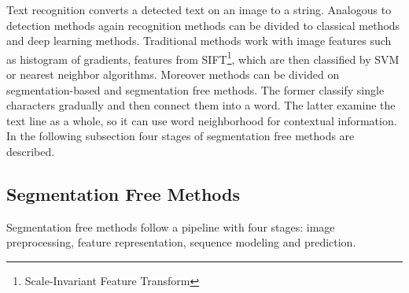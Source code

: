 Text recognition converts a detected text on an image to a string. Analogous to detection methods again recognition methods can be divided to classical methods and deep learning methods. Traditional methods work with image features such as histogram of gradients, features from SIFT\footnote{Scale-Invariant Feature Transform}, which are then classified by SVM or nearest neighbor algorithms. Moreover methods can be divided on segmentation-based and segmentation free methods. The former classify single characters gradually and then connect them into a word. The latter examine the text line as a whole, so it can use word neighborhood for contextual information. In the following subsection four stages of segmentation free methods are described.\cite{chen2021text,raisi2020text}

\subsection*{Segmentation Free Methods}

Segmentation free methods follow a pipeline with four stages: image preprocessing, feature representation, sequence modeling and prediction.

